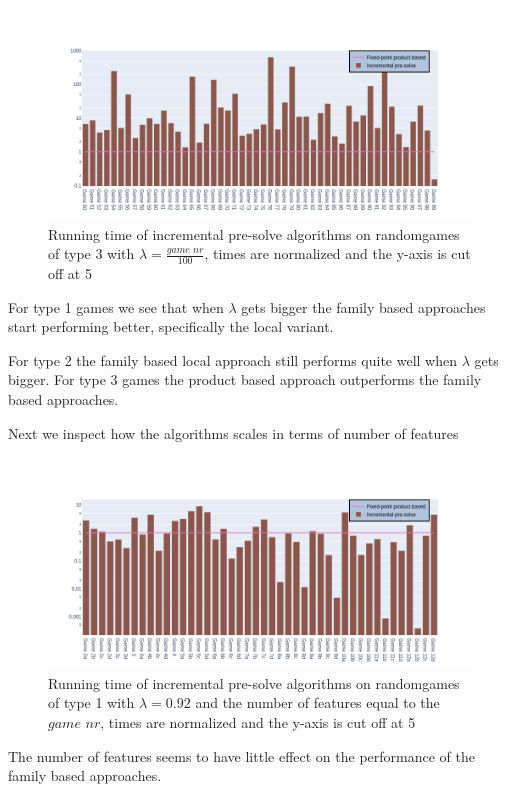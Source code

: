 \begin{figure}[H]
	\includegraphics[width=1\linewidth]{"results/BC_randomgames/Fixed-point product based_Incremental pre-solve_"}
	\caption{Running time of incremental pre-solve algorithms on randomgames of type 3 with $\lambda = \frac{\textit{game nr}}{100}$, times are normalized and the y-axis is cut off at 5}
	\label{fig:elevatorzlnks}
\end{figure}%
For type 1 games we see that when $\lambda$ gets bigger the family based approaches start performing better, specifically the local variant.

For type 2 the family based local approach still performs quite well when $\lambda$ gets bigger. For type 3 games the product based approach outperforms the family based approaches.

Next we inspect how the algorithms scales in terms of number of features
\begin{figure}[H]
	\includegraphics[width=1\linewidth]{"results/randomscalegames/Fixed-point product based_Incremental pre-solve_"}
	\caption{Running time of incremental pre-solve algorithms on randomgames of type 1 with $\lambda = 0.92$ and the number of features equal to the $\textit{game nr}$, times are normalized and the y-axis is cut off at 5}
	\label{fig:elevatorzlnks}
\end{figure}%
The number of features seems to have little effect on the performance of the family based approaches.

